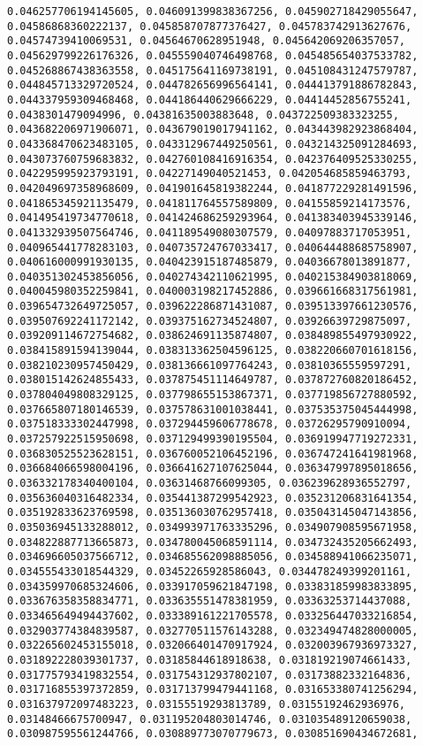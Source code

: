 \documentclass[11pt]{article}
\begin{document}
\begin{Verbatim}[commandchars=\\\{\}]
0.046257706194145605, 0.046091399838367256, 0.045902718429055647, 0.04586868360222137, 0.045858707877376427, 0.045783742913627676, 0.04574739410069531, 0.04564670628951948, 0.045642069206357057, 0.045629799226176326, 0.045559040746498768, 0.045485654037533782, 0.045268867438363558, 0.045175641169738191, 0.045108431247579787, 0.044845713329720524, 0.044782656996564141, 0.044413791886782843, 0.044337959309468468, 0.044186440629666229, 0.04414452856755241, 0.0438301479094996, 0.04381635003883648, 0.043722509383323255, 0.043682206971906071, 0.043679019017941162, 0.043443982923868404, 0.043368470623483105, 0.043312967449250561, 0.043214325091284693, 0.043073760759683832, 0.042760108416916354, 0.042376409525330255, 0.042295995923793191, 0.04227149040521453, 0.042054685859463793, 0.042049697358968609, 0.041901645819382244, 0.041877229281491596, 0.041865345921135479, 0.041811764557589809, 0.04155859214173576, 0.041495419734770618, 0.041424686259293964, 0.041383403945339146, 0.041332939507564746, 0.041189549080307579, 0.04097883717053951, 0.040965441778283103, 0.040735724767033417, 0.040644488685758907, 0.040616000991930135, 0.040423915187485879, 0.04036678013891877, 0.040351302453856056, 0.040274342110621995, 0.040215384903818069, 0.040045980352259841, 0.040003198217452886, 0.039661668317561981, 0.039654732649725057, 0.039622286871431087, 0.039513397661230576, 0.039507692241172142, 0.039375162734524807, 0.03926639729875097, 0.039209114672754682, 0.038624691135874807, 0.038489855497930922, 0.038415891594139044, 0.038313362504596125, 0.038220660701618156, 0.038210230957450429, 0.038136661097764243, 0.03810365559597291, 0.038015142624855433, 0.037875451114649787, 0.037872760820186452, 0.037804049808329125, 0.037798655153867371, 0.037719856727880592, 0.037665807180146539, 0.037578631001038441, 0.037535375045444998, 0.037518333302447998, 0.037294459606778678, 0.03726295790910094, 0.037257922515950698, 0.037129499390195504, 0.036919947719272331, 0.036830525523628151, 0.036760052106452196, 0.036747241641981968, 0.036684066598004196, 0.036641627107625044, 0.036347997895018656, 0.036332178340400104, 0.03631468766099305, 0.036239628936552797, 0.035636040316482334, 0.035441387299542923, 0.035231206831641354, 0.035192833623769598, 0.035136030762957418, 0.035043145047143856, 0.035036945133288012, 0.034993971763335296, 0.034907908595671958, 0.034822887713665873, 0.034780045068591114, 0.034732435205662493, 0.034696605037566712, 0.034685562098885056, 0.034588941066235071, 0.034555433018544329, 0.03452265928586043, 0.034478249399201161, 0.034359970685324606, 0.033917059621847198, 0.033831859983833895, 0.033676358358834771, 0.033635551478381959, 0.03363253714437088, 0.033465649494437602, 0.033389161221705578, 0.033256447033216854, 0.032903774384839587, 0.032770511576143288, 0.032349474828000005, 0.032265602453155018, 0.032066401470917924, 0.032003967936973327, 0.031892228039301737, 0.03185844618918638, 0.031819219074661433, 0.031775793419832554, 0.031754312937802107, 0.03173882332164836, 0.031716855397372859, 0.031713799479441168, 0.031653380741256294, 0.031637972097483223, 0.03155519293813789, 0.03155192462936976, 0.03148466675700947, 0.031195204803014746, 0.031035489120659038, 0.030987595561244766, 0.030889773070779673, 0.030851690434672681, 
\end{Verbatim}
\end{document}
